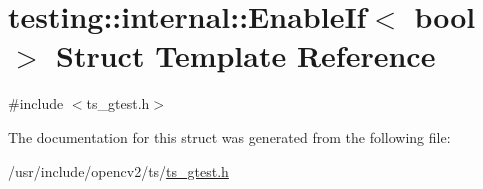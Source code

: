 \hypertarget{structtesting_1_1internal_1_1EnableIf}{\section{testing\-:\-:internal\-:\-:Enable\-If$<$ bool $>$ Struct Template Reference}
\label{structtesting_1_1internal_1_1EnableIf}
}


{\ttfamily \#include $<$ts\-\_\-gtest.\-h$>$}



The documentation for this struct was generated from the following file\-:\begin{DoxyCompactItemize}
\item 
/usr/include/opencv2/ts/\hyperlink{ts__gtest_8h}{ts\-\_\-gtest.\-h}\end{DoxyCompactItemize}
